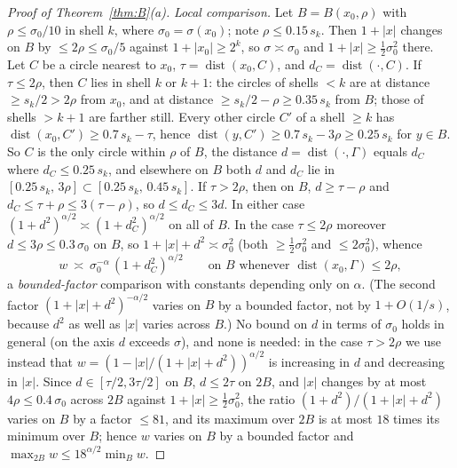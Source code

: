 \documentclass[11pt]{amsart}
\newcommand{\abs}[1]{\lvert #1\rvert}
\DeclareMathOperator{\dist}{dist}
\theoremstyle{plain}
\theoremstyle{definition}
\theoremstyle{remark}
\begin{document}
\begin{proof}[Proof of Theorem~\ref{thm:B}(a)]
\emph{Local comparison.} Let $B=B(x_0,\rho)$ with $\rho\le\sigma_0/10$ in shell
$k$, where $\sigma_0=\sigma(x_0)$; note $\rho\le0.15\,s_k$. Then $1+\abs x$ changes
on $B$ by $\le2\rho\le\sigma_0/5$ against $1+\abs{x_0}\ge2^k$, so
$\sigma\asymp\sigma_0$ and $1+\abs x\ge\tfrac12\sigma_0^2$ there. Let $C$ be a
circle nearest to $x_0$, $\tau=\dist(x_0,C)$, and $d_C=\dist(\cdot,C)$. If
$\tau\le2\rho$, then $C$ lies in shell $k$ or $k+1$: the circles of shells $<k$
are at distance $\ge s_k/2>2\rho$ from $x_0$, and at distance $\ge s_k/2-\rho\ge
0.35\,s_k$ from $B$; those of shells $>k+1$ are farther still. Every other circle
$C'$ of a shell $\ge k$ has $\dist(x_0,C')\ge0.7\,s_k-\tau$, hence
$\dist(y,C')\ge0.7\,s_k-3\rho\ge0.25\,s_k$ for $y\in B$. So $C$ is the only circle
within $\rho$ of $B$, the distance $d=\dist(\cdot,\Gamma)$ equals $d_C$ where
$d_C\le0.25\,s_k$, and elsewhere on $B$ both $d$ and $d_C$ lie in
$[0.25\,s_k,\,3\rho]\subset[0.25\,s_k,\,0.45\,s_k]$. If $\tau>2\rho$, then on $B$,
$d\ge\tau-\rho$ and $d_C\le\tau+\rho\le3(\tau-\rho)$, so $d\le d_C\le3d$. In either
case $(1+d^2)^{\alpha/2}\asymp(1+d_C^2)^{\alpha/2}$ on all of $B$. In the case
$\tau\le2\rho$ moreover $d\le3\rho\le0.3\,\sigma_0$ on $B$, so
$1+\abs x+d^2\asymp\sigma_0^2$ (both $\ge\tfrac12\sigma_0^2$ and
$\le2\sigma_0^2$), whence
\begin{equation}\label{eq:wcompare}
w\ \asymp\ \sigma_0^{-\alpha}\,(1+d_C^2)^{\alpha/2}\qquad\text{on }B
\text{ whenever }\dist(x_0,\Gamma)\le2\rho,
\end{equation}
a \emph{bounded-factor} comparison with constants depending only on $\alpha$.
(The second factor $(1+\abs x+d^2)^{-\alpha/2}$ varies on $B$ by a bounded
factor, not by $1+O(1/s)$, because $d^2$ as well as $\abs x$ varies across $B$.)
No bound on $d$ in terms of $\sigma_0$ holds in general (on the axis $d$ exceeds
$\sigma$), and none is needed: in the case $\tau>2\rho$ we use instead that
$w=(1-\abs x/(1+\abs x+d^2))^{\alpha/2}$ is increasing in $d$ and decreasing in
$\abs x$. Since $d\in[\tau/2,3\tau/2]$ on $B$, $d\le2\tau$ on $2B$, and $\abs x$
changes by at most $4\rho\le0.4\,\sigma_0$ across $2B$ against $1+\abs x\ge
\tfrac12\sigma_0^2$, the ratio $(1+d^2)/(1+\abs x+d^2)$ varies on $B$ by a factor
$\le81$, and its maximum over $2B$ is at most $18$ times its minimum over $B$;
hence $w$ varies on $B$ by a bounded factor and $\max_{2B}w\le18^{\alpha/2}
\min_Bw$.


\end{proof}
\end{document}
